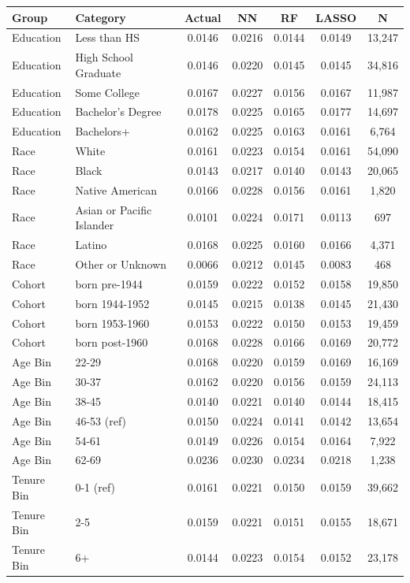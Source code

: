 \begin{tabular}{llccccc}
\hline\hline
Group & Category & Actual & NN & RF & LASSO & N \\
\hline
Education&Less than HS&0.0146&0.0216&0.0144&0.0149&13,247\\
Education&High School Graduate&0.0146&0.0220&0.0145&0.0145&34,816\\
Education&Some College&0.0167&0.0227&0.0156&0.0167&11,987\\
Education&Bachelor's Degree&0.0178&0.0225&0.0165&0.0177&14,697\\
Education&Bachelors+&0.0162&0.0225&0.0163&0.0161&6,764\\
Race&White&0.0161&0.0223&0.0154&0.0161&54,090\\
Race&Black&0.0143&0.0217&0.0140&0.0143&20,065\\
Race&Native American&0.0166&0.0228&0.0156&0.0161&1,820\\
Race&Asian or Pacific Islander&0.0101&0.0224&0.0171&0.0113&697\\
Race&Latino&0.0168&0.0225&0.0160&0.0166&4,371\\
Race&Other or Unknown&0.0066&0.0212&0.0145&0.0083&468\\
Cohort&born pre-1944&0.0159&0.0222&0.0152&0.0158&19,850\\
Cohort&born 1944-1952&0.0145&0.0215&0.0138&0.0145&21,430\\
Cohort&born 1953-1960&0.0153&0.0222&0.0150&0.0153&19,459\\
Cohort&born post-1960&0.0168&0.0228&0.0166&0.0169&20,772\\
Age Bin&22-29&0.0168&0.0220&0.0159&0.0169&16,169\\
Age Bin&30-37&0.0162&0.0220&0.0156&0.0159&24,113\\
Age Bin&38-45&0.0140&0.0221&0.0140&0.0144&18,415\\
Age Bin&46-53 (ref)&0.0150&0.0224&0.0141&0.0142&13,654\\
Age Bin&54-61&0.0149&0.0226&0.0154&0.0164&7,922\\
Age Bin&62-69&0.0236&0.0230&0.0234&0.0218&1,238\\
Tenure Bin&0-1 (ref)&0.0161&0.0221&0.0150&0.0159&39,662\\
Tenure Bin&2-5&0.0159&0.0221&0.0151&0.0155&18,671\\
Tenure Bin&6+&0.0144&0.0223&0.0154&0.0152&23,178\\
\hline\hline
\end{tabular}
